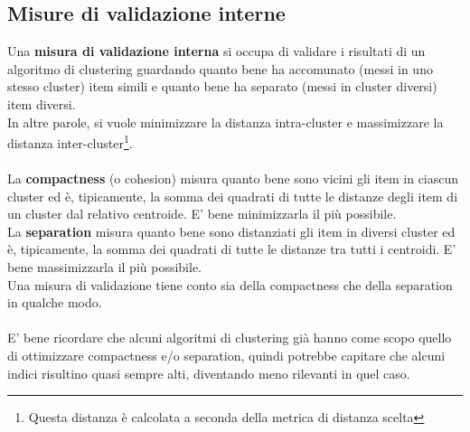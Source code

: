 \subsection{Misure di validazione interne}
Una \textbf{misura di validazione interna} si occupa di validare i risultati di un algoritmo di clustering guardando quanto bene ha accomunato (messi in uno stesso cluster) item simili e quanto bene ha separato (messi in cluster diversi) item diversi.\\
In altre parole, si vuole minimizzare la distanza intra-cluster e massimizzare la distanza inter-cluster\footnote{Questa distanza è calcolata a seconda della metrica di distanza scelta}.\\
\\
La \textbf{compactness} (o cohesion) misura quanto bene sono vicini gli item in ciascun cluster ed è, tipicamente, la somma dei quadrati di tutte le distanze degli item di un cluster dal relativo centroide. E' bene minimizzarla il più possibile.\\
La \textbf{separation} misura quanto bene sono distanziati gli item in diversi cluster ed è, tipicamente, la somma dei quadrati di tutte le distanze tra tutti i centroidi. E' bene massimizzarla il più possibile.\\
Una misura di validazione tiene conto sia della compactness che della separation in qualche modo.\\
\\
E' bene ricordare che alcuni algoritmi di clustering già hanno come scopo quello di ottimizzare compactness e/o separation, quindi potrebbe capitare che alcuni indici risultino quasi sempre alti, diventando meno rilevanti in quel caso.

